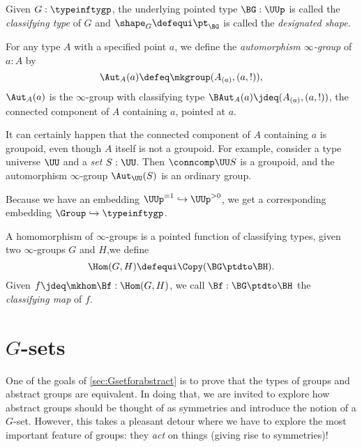 \begin{definition}\label{def:classifyingspace}
  Given $G:\typeinftygp$,
  the underlying pointed type $\BG : \UUp$
  is called the  \emph{classifying type} of $G$ and $\shape_G\defequi \pt_{\BG}$
  is called the \emph{designated shape}.
\end{definition}

\begin{definition}
  For any type $A$ with a specified point $a$,
  we define the \emph{automorphism $\infty$-group} of $a:A$ by
  \[
    \Aut_A(a) \defeq \mkgroup (A_{(a)},(a,!)),
  \]
  \ie $\Aut_A(a)$ is the $\infty$-group with classifying type
  $\BAut_A(a) \jdeq (A_{(a)},(a,!))$,
  the connected component of $A$ containing $a$, pointed at $a$.
\end{definition}

\begin{remark}\label{rem:autinfgp}
  It can certainly happen that the connected component of $A$ containing $a$
  is groupoid, even though $A$ itself is not a groupoid.
  For example, consider a type universe $\UU$ and a \emph{set} $S:\UU$.
  Then $\conncomp\UU S$ is a groupoid, and the automorphism $\infty$-group
  $\Aut_\UU(S)$ is an ordinary group.

  Because we have an embedding $\UUp^{=1} \hookrightarrow \UUp^{>0}$,
  we get a corresponding embedding $\Group \hookrightarrow \typeinftygp$.
\end{remark}

\begin{definition}
  A homomorphism of $\infty$-groups is a pointed function of classifying types, \ie
  given two $\infty$-groups $G$ and $H$,we define
  \[
    \Hom(G,H)\defequi\Copy(\BG\ptdto\BH).
  \]
  Given $f \jdeq \mkhom\Bf: \Hom(G,H)$, we call
  $\Bf : \BG\ptdto\BH$ the \emph{classifying map} of $f$.
\end{definition}

\section{$G$-sets}
\label{sec:gsets}

One of the goals of \cref{sec:Gsetforabstract} is to prove that the types of groups and abstract groups are equivalent.
In doing that, we are invited to explore how abstract groups should be thought of as symmetries and introduce the notion of a $G$-set.
However, this takes a pleasant detour where we have to explore the most important feature of groups: they \emph{act} on things (giving rise to symmetries)!


